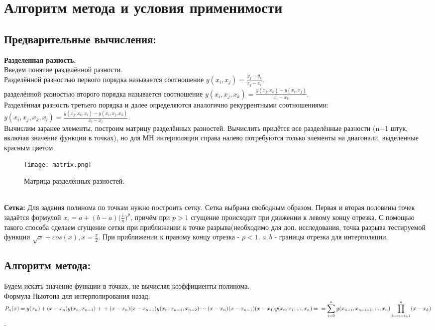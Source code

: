 \documentclass[12pt]{article}
\begin{document}
\section{Алгоритм метода и условия применимости}
\subsection{Предварительные вычисления:}
\textbf{Разделенная разность.}\\
Введем понятие разделённой разности.\\
Разделённой разностью первого порядка называется соотношение $\displaystyle y(x_i, x_j) = \frac{y_j - y_i}{x_j - x_i}$.\\
разделённой разностью второго порядка называется соотношение $\displaystyle y(x_i, x_j, x_k) = \frac{y(x_j, x_k) - y(x_i, x_j)}{x_i - x_k} $.\\
Разделённая разность третьего порядка и далее определяются аналогично
рекуррентными соотношениями:\\
$\displaystyle y(x_i, x_j, x_k, x_l) = \frac{y(x_j, x_k, x_l) - y(x_i, x_j, x_k)}{x_l - x_i}$.\\
Вычислим заранее элементы, построим матрицу разделённых разностей.
Вычислить придётся все разделённые разности (n+1 штук, включая значение функции в точках), но для МН интерполяции справа налево потребуются только элементы на диагонали, выделенные красным цветом.\\
\begin{figure}[h!]
\center
\texttt{[image: matrix.png]}
\caption{Матрица разделённых разностей.}
\end{figure}\\
\textbf{Сетка:}
Для задания полинома по точкам нужно построить сетку. Сетка выбрана свободным образом. Первая и вторая половины точек задаётся формулой $\displaystyle x_i = a + (b-a)\biggr(\frac{i}{n}\biggl)^{p}$, причём при $p > 1$ сгущение происходит при движении к левому концу отрезка. С помощью такого способа сделаем сгущение сетки при приближении к точке разрыва(необходимо для доп. исследования, точка разрыва тестируемой функции $\displaystyle \sqrt{x} + cos(x),  x = \frac{\pi}{2}$. При приближении к правому концу отрезка - $ p < 1$. $a, b$ - границы отрезка для интерполяции.
\subsection{Алгоритм метода:}
Будем искать значение функции в точках, не вычисляя коэффициенты полинома.\\
Формула Ньютона для интерполирования назад: $\displaystyle P_n(x) = y(x_n) + (x-x_n)y(x_n, x_{n-1}) +\\+ (x-x_n)(x-x_{n-1})y(x_n, x_{n-1},x_{n-2}) \cdots (x-x_n)(x-x_{n-1})(x-x_1)y(x_0,x_1,...,x_n) =\\= \sum_{i=0}^{n}y(x_{n-i},x_{n-i+1},..., x_{n})\prod_{k = n-i+1}^{n}(x-x_k)$.
\end{document}
